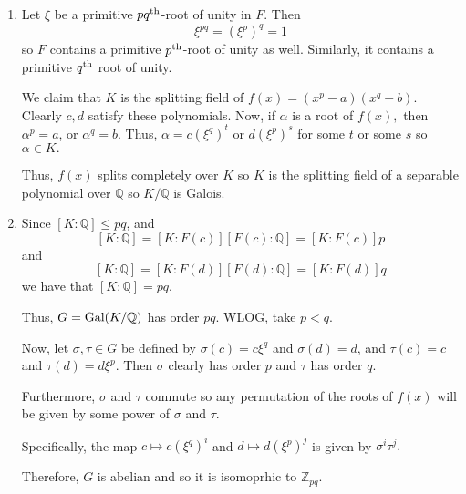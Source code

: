 \documentclass[12pt]{Qual}
\begin{document}
\begin{solution}$\,$
\begin{enumerate}[label=(\alph*)]
    \item Let $\xi$ be a primitive $pq^\text{th}$-root of unity in $F$. Then $$\xi^{pq}=(\xi^p)^q=1$$ so $F$ contains a primitive $p^\text{th}$-root of unity as well. Similarly, it contains a primitive $q^\text{th}$ root of unity.

    We claim that $K$ is the splitting field of $f(x)=(x^p-a)(x^q-b)$. Clearly $c,d$ satisfy these polynomials. Now, if $\alpha$ is a root of $f(x),$ then $\alpha^p=a$, or $\alpha^q=b$. Thus, $\alpha=c(\xi^q)^t$ or $d(\xi^p)^s$ for some $t$ or some $s$ so $\alpha\in K.$

    Thus, $f(x)$ splits completely over $K$ so $K$ is the splitting field of a separable polynomial over $\mathbb{Q}$ so $K/\mathbb{Q}$ is Galois.

    \item
    Since $[K:\mathbb{Q}]\le pq$, and $$[K:\mathbb{Q}]=[K:F(c)][F(c):\mathbb{Q}]=[K:F(c)]p$$ and $$[K:\mathbb{Q}]=[K:F(d)][F(d):\mathbb{Q}]=[K:F(d)]q$$ we have that $[K:\mathbb{Q}]=pq.$

    Thus, $G=\text{Gal}(K/\mathbb{Q})$ has order $pq.$ WLOG, take $p<q$.

    Now, let $\sigma,\tau\in G$ be defined by $\sigma(c)=c\xi^q$ and $\sigma(d)=d$, and $\tau(c)=c$ and $\tau(d)=d\xi^p$. Then $\sigma$ clearly has order $p$ and $\tau$ has order $q$.

    Furthermore, $\sigma$ and $\tau$ commute so any permutation of the roots of $f(x)$ will be given by some power of $\sigma$ and $\tau.$

    Specifically, the map $c\mapsto c(\xi^q)^i$ and $d\mapsto d(\xi^p)^j$ is given by $\sigma^i\tau^j.$

    Therefore, $G$ is abelian and so it is isomoprhic to $\mathbb{Z}_{pq}.$


    \begin{comment}
    Namely, $\langle\sigma\rangle$ generates a Sylow $p$-subgroup and $\langle\tau\rangle$ generates a Sylow $q$-subgroup.

    Finally, by Sylow, $n_q=1$ since $n_q|p$ and $n_q\equiv 1\mod q$ but $p<q.$

    Thus, $\langle\tau\rangle$ is the unique Sylow $q$-subgroup, and since it commutes with $\langle\sigma\rangle$,

    Since $\sigma$ and $\tau$ commute, we actually have that any


    Then If $p\nmid|(q-1)$ then by Sylow, $n_p\equiv 1\mod p$ and $n_p|q$ so $n_p=1$.


\end{comment}
\end{enumerate}
\end{solution}
\end{document}
